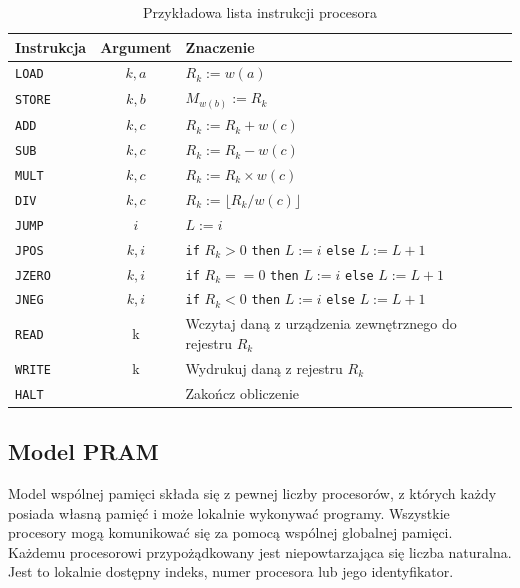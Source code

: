 \documentclass[a4paper,oneside,leqno,12pt]{book}
\theoremstyle{definition}
\theoremstyle{plain}
\theoremstyle{remark}
\begin{document}
\begin{table}[H]
\begin{center}
\caption{Przykładowa lista instrukcji procesora\cite{Czech}}
\label{tab:ram_instructions}
\begin{tabular}{|l|c|l|}
\hline
Instrukcja & Argument & Znaczenie \\ \hline
\texttt{LOAD} & \(k, a\) & \(R_k:=w(a)\) \\
\texttt{STORE} & \(k, b\) & \(M_{w(b)}:=R_{k}\) \\
\texttt{ADD} & \(k, c\) & \(R_{k}:=R_{k}+w(c)\) \\
\texttt{SUB} & \(k, c\) & \(R_{k}:=R_{k}-w(c)\)\\
\texttt{MULT} & \(k, c\) & \(R_{k}:=R_{k} \times w(c)\)\\
\texttt{DIV} & \(k, c\) & \(R_{k}:=\lfloor R_{k}/w(c)\rfloor\) \\
\texttt{JUMP} &  \(i\) & \(L:=i\) \\
\texttt{JPOS} & \(k,i\) & \texttt{if} \(R_k>0\) \texttt{then} \(L:=i\) \texttt{else} \(L:=L+1\) \\
\texttt{JZERO} & \(k,i\) & \texttt{if} \(R_k==0\) \texttt{then} \(L:=i\) \texttt{else} \(L:=L+1\) \\
\texttt{JNEG} & \(k,i\) & \texttt{if} \(R_k<0\) \texttt{then} \(L:=i\) \texttt{else} \(L:=L+1\) \\
\texttt{READ} & k & Wczytaj daną z urządzenia zewnętrznego do rejestru \(R_k\) \\
\texttt{WRITE} & k & Wydrukuj daną z rejestru \(R_k\) \\
\texttt{HALT} & & Zakończ obliczenie \\ \hline
\end{tabular}
\end{center}
\end{table}


\label{subsec:PRAM}
\subsection{Model PRAM}

Model wspólnej pamięci składa się z pewnej liczby procesorów, z których każdy posiada własną pamięć i może lokalnie wykonywać programy. Wszystkie procesory mogą komunikować się za pomocą wspólnej globalnej pamięci.\\
Każdemu procesorowi przypożądkowany jest niepowtarzająca się liczba naturalna. Jest to lokalnie dostępny indeks, numer procesora lub jego identyfikator.\\
\end{document}
